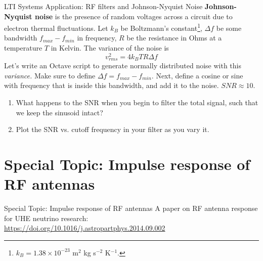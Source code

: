 \documentclass{beamer}
\begin{document}
\begin{frame}[fragile]{LTI Systems Application: RF filters and Johnson-Nyquist Noise}
\small
\textbf{Johnson-Nyquist noise} is the presence of random voltages across a circuit due to electron thermal fluctuations. Let $k_B$ be Boltzmann's constant\footnote{$k_B = 1.38 \times 10^{-23}$ m$^2$ kg s$^{-2}$ K$^{-1}$.}, $\Delta f$ be some bandwidth $f_{max} - f_{min}$ in frequency, $R$ be the resistance in Ohms at a temperature $T$ in Kelvin. The variance of the noise is
\begin{equation}
v^2_{rms} = 4 k_B T R \Delta f
\end{equation}
Let's write an Octave script to generate normally distributed noise with this \textit{variance.}  Make sure to define $\Delta f = f_{max} - f_{min}$.  Next, define a cosine or sine with frequency that is inside this bandwidth, and add it to the noise.  $SNR \approx 10$.
\begin{enumerate}
\item What happens to the SNR when you begin to filter the total signal, such that we keep the sinusoid intact?
\item Plot the SNR vs. cutoff frequency in your filter as you vary it.
\end{enumerate}
\end{frame}

\section{Special Topic: Impulse response of RF antennas}

\begin{frame}{Special Topic: Impulse response of RF antennas}
\small
A paper on RF antenna response for UHE neutrino research: \\ \url{https://doi.org/10.1016/j.astropartphys.2014.09.002}
\end{frame}
\end{document}
